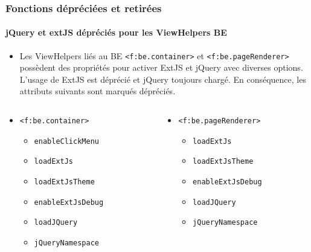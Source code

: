 
\begin{frame}[fragile]
	\frametitle{Fonctions dépréciées et retirées}
	\framesubtitle{jQuery et extJS dépréciés pour les ViewHelpers BE}

	\begin{itemize}
		\item Les ViewHelpers liés au BE \texttt{<f:be.container>} et \texttt{<f:be.pageRenderer>}
			possèdent des propriétés pour activer ExtJS et jQuery avec diverses options. L'usage de
			ExtJS est déprécié et jQuery toujours chargé. En conséquence, les attributs suivants
			sont marqués dépréciés.
	\end{itemize}

	\begin{columns}[T]
		\begin{column}{0.5\textwidth}
			\begin{itemize}
				\item \texttt{<f:be.container>}
					\begin{itemize}
						\item \texttt{enableClickMenu}
						\item \texttt{loadExtJs}
						\item \texttt{loadExtJsTheme}
						\item \texttt{enableExtJsDebug}
						\item \texttt{loadJQuery}
						\item \texttt{jQueryNamespace}
					\end{itemize}
			\end{itemize}
		\end{column}

		\begin{column}{0.5\textwidth}
			\begin{itemize}
				\item \texttt{<f:be.pageRenderer>}
					\begin{itemize}
						\item \texttt{loadExtJs}
						\item \texttt{loadExtJsTheme}
						\item \texttt{enableExtJsDebug}
						\item \texttt{loadJQuery}
						\item \texttt{jQueryNamespace}
					\end{itemize}
			\end{itemize}
		\end{column}
	\end{columns}

\end{frame}

